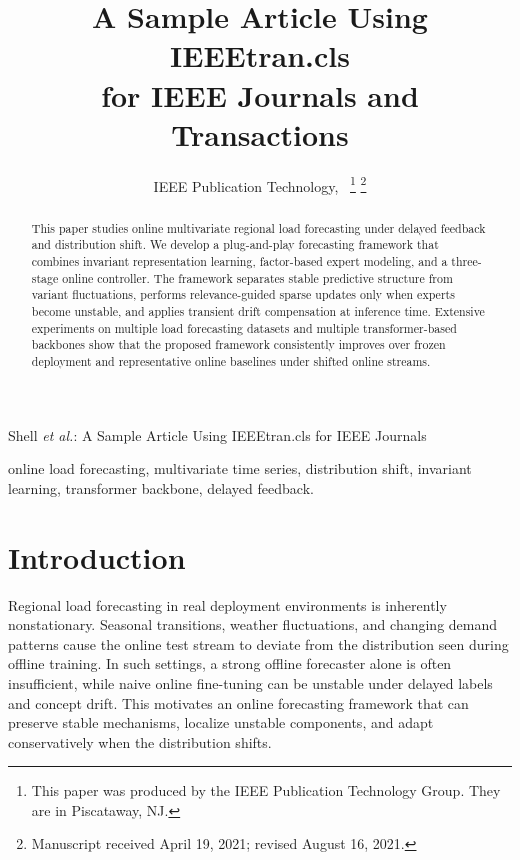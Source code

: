 ﻿\documentclass[journal]{IEEEtran}
\begin{document}
\title{A Sample Article Using IEEEtran.cls\\ for IEEE Journals and Transactions}

\author{IEEE Publication Technology,~
\thanks{This paper was produced by the IEEE Publication Technology Group. They are in Piscataway, NJ.}%
\thanks{Manuscript received April 19, 2021; revised August 16, 2021.}}

%
{Shell \MakeLowercase{\textit{et al.}}: A Sample Article Using IEEEtran.cls for IEEE Journals}


\maketitle

\begin{abstract}
This paper studies online multivariate regional load forecasting under delayed feedback and distribution shift. We develop a plug-and-play forecasting framework that combines invariant representation learning, factor-based expert modeling, and a three-stage online controller. The framework separates stable predictive structure from variant fluctuations, performs relevance-guided sparse updates only when experts become unstable, and applies transient drift compensation at inference time. Extensive experiments on multiple load forecasting datasets and multiple transformer-based backbones show that the proposed framework consistently improves over frozen deployment and representative online baselines under shifted online streams.
\end{abstract}

\begin{IEEEkeywords}
online load forecasting, multivariate time series, distribution shift, invariant learning, transformer backbone, delayed feedback.
\end{IEEEkeywords}

\section{Introduction}
Regional load forecasting in real deployment environments is inherently nonstationary. Seasonal transitions, weather fluctuations, and changing demand patterns cause the online test stream to deviate from the distribution seen during offline training. In such settings, a strong offline forecaster alone is often insufficient, while naive online fine-tuning can be unstable under delayed labels and concept drift. This motivates an online forecasting framework that can preserve stable mechanisms, localize unstable components, and adapt conservatively when the distribution shifts.
\end{document}
